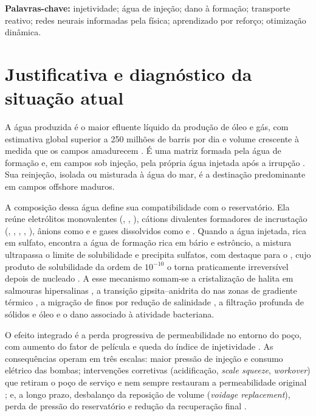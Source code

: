 \documentclass[10pt,a4paper]{article}
\newcommand{\itemedital}[1]{}
\begin{document}
\noindent\textbf{Palavras-chave:} injetividade; água de injeção; dano à formação; transporte reativo; redes neurais informadas pela física; aprendizado por reforço; otimização dinâmica.

\section{Justificativa e diagnóstico da situação atual}\itemedital{2.16 VIII; Anexo 1 C}

A água produzida é o maior efluente líquido da produção de óleo e gás, com estimativa global superior a 250 milhões de barris por dia e volume crescente à medida que os campos amadurecem \cite{macedonio2014,elbadawy2021}. É uma matriz formada pela água de formação
e, em campos sob injeção, pela própria água injetada após a irrupção \cite{liang2018}. Sua reinjeção, isolada ou misturada à água do mar, é a destinação predominante em campos offshore maduros.

A composição dessa água define sua compatibilidade com o reservatório. Ela reúne
eletrólitos monovalentes (, , ), cátions divalentes formadores de
incrustação (, , , , ), ânions como
 e  e gases dissolvidos como  e 
\cite{kamal2018}. Quando a água injetada, rica em sulfato, encontra a água de formação rica
em bário e estrôncio, a mistura ultrapassa o limite de solubilidade e precipita sulfatos,
com destaque para o , cujo produto de solubilidade da ordem de $10^{-10}$ o
torna praticamente irreversível depois de nucleado \cite{binmerdhah2010,bedrikovetsky2009}.
A esse mecanismo somam-se a cristalização de halita em salmouras hipersalinas
\cite{rocha2001,miri2016}, a transição gipsita--anidrita do  nas zonas de gradiente
térmico \cite{kamalipour2017}, a migração de finos por redução de salinidade
\cite{khilar1984}, a filtração profunda de sólidos e óleo \cite{pangsharma1997} e o dano
associado à atividade bacteriana.

O efeito integrado é a perda progressiva de permeabilidade no entorno do poço, com aumento
do fator de película e queda do índice de injetividade \cite{bedrikovetsky2009,pal2023}.
As consequências operam em três escalas: maior pressão de injeção e consumo elétrico das
bombas; intervenções corretivas (acidificação, \textit{scale squeeze}, \textit{workover})
que retiram o poço de serviço e nem sempre restauram a permeabilidade original
\cite{kermani2023,shabani2019}; e, a longo prazo, desbalanço da reposição de volume
(\textit{voidage replacement}), perda de pressão do reservatório e redução da recuperação
final \cite{liang2018}.
\end{document}
